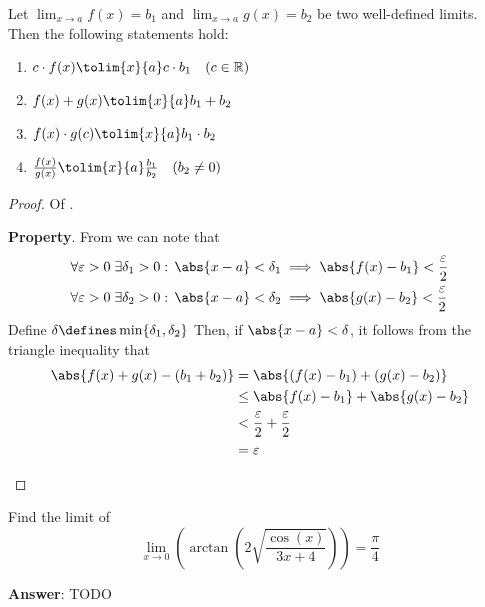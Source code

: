\begin{thm}\label{thm-limit-arithmetic}
	Let $\displaystyle\lim_{x \to a}f(x) = b_1$ and $\displaystyle\lim_{x \to a}g(x) = b_2$
	be two well-defined limits. Then the following statements hold:
	\begin{enumerate}
		\item $c \cdot f(x) \tolim{x}{a} c \cdot b_1 \quad (c\in\mathbb{R})$
		\item $f(x) + g(x) \tolim{x}{a} b_1 + b_2$
		\item $f(x) \cdot g(c) \tolim{x}{a} b_1 \cdot b_2$
		\item $\tfrac{f(x)}{g(x)} \tolim{x}{a} \tfrac{b_1}{b_2} \quad (b_2 \neq 0)$
	\end{enumerate}
\end{thm}


\begin{proof}
	Of .
	\begin{flushleft}
		\textbf{ Property}. From 
		we can note that
		\begin{align*}
			 & \forall\varepsilon>0\;\exists\delta_1>0:\,\abs{x-a}<\delta_1\implies\abs{f(x)-b_1}<\frac{\varepsilon}{2} \\
			 & \forall\varepsilon>0\;\exists\delta_2>0:\,\abs{x-a}<\delta_2\implies\abs{g(x)-b_2}<\frac{\varepsilon}{2}
		\end{align*}
		Define $\delta\defines\min\{\delta_1,\delta_2\}$ Then, if $\abs{x-a}<\delta$,
		it follows from the triangle inequality that
		\begin{align*}
			\abs{f(x)+g(x)-(b_1+b_2)} & =\abs{(f(x)-b_1)+(g(x)-b_2)}                 \\
			                          & \leq\abs{f(x)-b_1}+\abs{g(x)-b_2}            \\
			                          & <\frac{\varepsilon}{2}+\frac{\varepsilon}{2} \\
			                          & =\varepsilon
		\end{align*}
	\end{flushleft}
\end{proof}

\begin{exm}
	Find the limit of
	\begin{equation*}
		\lim_{x \to 0}\left(\arctan\left(2\sqrt{\frac{\cos(x)}{3x+4}}\right)\right)=\frac{\pi}{4}
	\end{equation*}
	\begin{flushleft}
		\textbf{Answer}: TODO
	\end{flushleft}
\end{exm}

